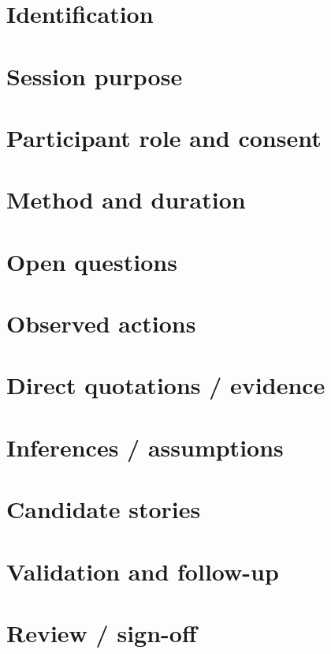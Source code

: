\documentclass[11pt,letterpaper]{article}
\begin{document}
\section{Identification}
\section{Session purpose}
\section{Participant role and consent}
\section{Method and duration}
\section{Open questions}
\section{Observed actions}
\clearpage
\section{Direct quotations / evidence}
\section{Inferences / assumptions}
\section{Candidate stories}
\section{Validation and follow-up}
\clearpage
\section{Review / sign-off}
\end{document}
